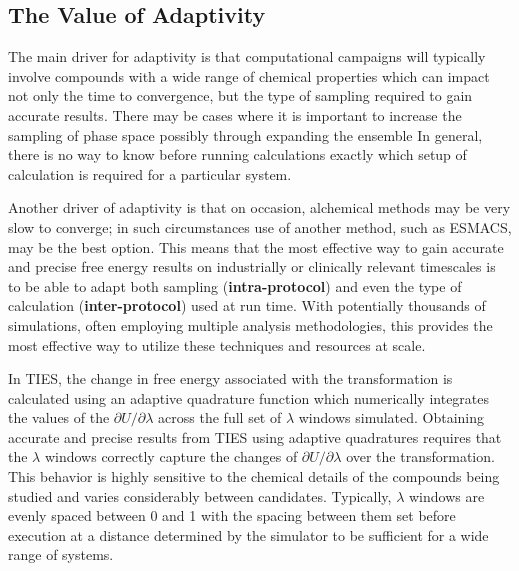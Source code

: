 
\subsection{The Value of Adaptivity}\label{ssec:adapt_ties}

The main driver for adaptivity is that computational campaigns will
typically involve compounds with a wide range of chemical properties which can
impact not only the time to convergence, but the type of sampling required to
gain accurate results. There may be cases where it is important to 
increase the sampling of phase space possibly through expanding the ensemble 
In general, there is no way to know before running calculations exactly which 
setup of calculation is required for a particular system. 

Another driver of adaptivity is that on occasion, alchemical methods may be very 
slow to converge; in such circumstances use of another method, such as ESMACS,
may be the best option. This means that the most effective way to gain accurate 
and precise free energy results on industrially or clinically relevant 
timescales is to be able to adapt both sampling (\textbf{intra-protocol}) and 
even the type of calculation (\textbf{inter-protocol}) used at run time. With 
potentially thousands of simulations, often employing multiple analysis 
methodologies, this provides the most effective way to utilize these techniques 
and resources at scale.

In TIES, the change in free energy 
associated with the transformation is calculated using an adaptive quadrature 
function which numerically integrates the values of the 
$\partial U/\partial\lambda$ across the full set of $\lambda$ windows simulated. 
Obtaining accurate and precise results from TIES using adaptive quadratures 
requires that the $\lambda$ windows correctly capture the changes of 
$\partial U/\partial\lambda$ over the transformation. This behavior is highly 
sensitive to the chemical details of the 
compounds being studied and varies considerably between candidates. Typically, 
$\lambda$ windows are evenly spaced between 0 and 1 with the spacing between 
them set before execution at a distance determined by the simulator to be 
sufficient for a wide range of systems. 

